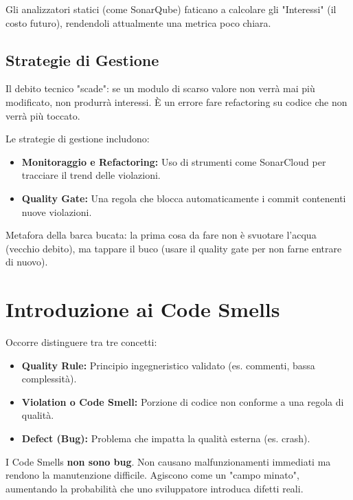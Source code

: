 \begin{notaslide}
Gli analizzatori statici (come SonarQube) faticano a calcolare gli "Interessi" (il costo futuro), rendendoli attualmente una metrica poco chiara.
\end{notaslide}

\subsection{Strategie di Gestione}
\begin{notaprof}
Il debito tecnico "scade": se un modulo di scarso valore non verrà mai più modificato, non produrrà interessi. È un errore fare refactoring su codice che non verrà più toccato.
\end{notaprof}

Le strategie di gestione includono:
\begin{itemize}
    \item \textbf{Monitoraggio e Refactoring:} Uso di strumenti come SonarCloud per tracciare il trend delle violazioni.
    \item \textbf{Quality Gate:} Una regola che blocca automaticamente i commit contenenti nuove violazioni.
\end{itemize}

\begin{notaprof}
Metafora della barca bucata: la prima cosa da fare non è svuotare l'acqua (vecchio debito), ma tappare il buco (usare il quality gate per non farne entrare di nuovo).
\end{notaprof}

\section{Introduzione ai Code Smells}
Occorre distinguere tra tre concetti:
\begin{itemize}
    \item \textbf{Quality Rule:} Principio ingegneristico validato (es. commenti, bassa complessità).
    \item \textbf{Violation o Code Smell:} Porzione di codice non conforme a una regola di qualità.
    \item \textbf{Defect (Bug):} Problema che impatta la qualità esterna (es. crash).
\end{itemize}

\begin{notaesame}
I Code Smells \textbf{non sono bug}. Non causano malfunzionamenti immediati ma rendono la manutenzione difficile. Agiscono come un "campo minato", aumentando la probabilità che uno sviluppatore introduca difetti reali.
\end{notaesame}

